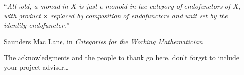 \documentclass[
11pt, %
english, %
singlespacing, %
headsepline, %
]{MastersDoctoralThesis} %
\begin{document}
\cleardoublepage


\vspace*{0.2\textheight}

\noindent\enquote{\itshape All told, a monad in $X$ is just a monoid in the
  category of endofunctors of $X$, with product $\times$ replaced by composition
  of endofunctors and unit set by the identity endofunctor.}\bigbreak

\hfill Saunders Mac Lane, in \emph{Categories for the Working Mathematician}


\begin{abstract}
  \addchaptertocentry{\abstractname} %
  
\end{abstract}


\begin{acknowledgements}
  \addchaptertocentry{\acknowledgementname} %
  The acknowledgments and the people to thank go here, don't forget to include
  your project advisor\ldots
\end{acknowledgements}


\tableofcontents %

\listoffigures %

\listoftables %

\end{document}
